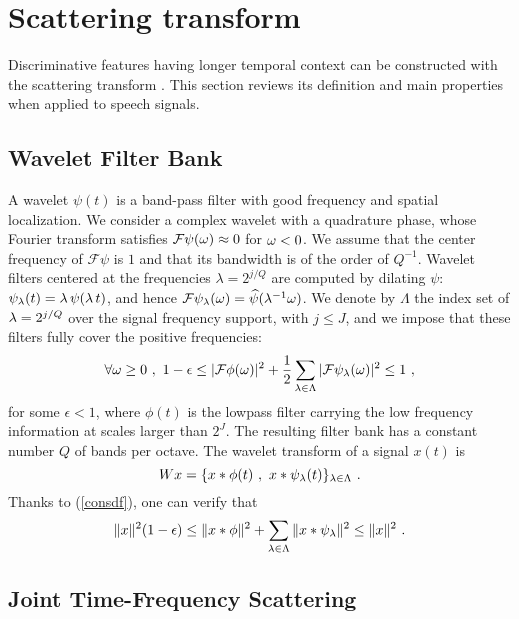 \section{Scattering transform}
\label{scattsec}

Discriminative features having longer temporal context can be constructed with the 
scattering transform \cite{pami, deepscatt}. 
This section reviews its definition and main properties when applied to speech signals.

\subsection{Wavelet Filter Bank}

A wavelet $\psi (t)$ is a band-pass filter with good frequency and spatial localization.
 We consider a complex wavelet with a quadrature phase, 
whose Fourier transform satisfies
$\mathcal{F} \psi({\omega}) \approx 0$ for ${\omega} < 0$.
We assume that the center frequency of $\mathcal{F} \psi$ is $1$ and 
that its bandwidth is of the order of $Q^{-1}$. 
Wavelet filters centered
at the frequencies $\lambda = 2^{j/Q}$ are computed by dilating $\psi$:
$\psi_{\lambda} (t) = {\lambda}\, \psi({\lambda}\, t)$, and hence $\mathcal{F} \psi_{\lambda} ({\omega}) = \widehat \psi({\lambda}^{-1} \omega)$.
We denote by $\Lambda$ the index set of ${\lambda} = 2^{j/Q}$ over
the signal frequency support, with $j \leq J$, 
and we impose that these filters fully cover the positive frequencies:
\begin{equation}
\label{consdf}
\forall {\omega} \geq 0~,~ 1- \epsilon 
\leq |\mathcal{F}{\phi}(\omega)|^2 + \frac 1 2 \sum_{{\lambda} \in \Lambda} |\mathcal{F}{\psi}_{\lambda}(\omega)|^2 \leq 1~,
\end{equation}
for some $\epsilon <1$, where $\phi(t)$ is the lowpass filter carrying the 
low frequency information at scales larger than $2^J$.
The resulting filter bank has a constant number $Q$ of bands per 
octave. The wavelet transform of a signal $x(t)$ is
\[
W x = \{x \ast \phi(t)~,~x \ast \psi_{\lambda}(t)  \}_{{\lambda} \in \Lambda}~.
\]
Thanks to (\ref{consdf}), one can verify that 
\begin{equation}
\label{lp_basic}
\| x \|^2 (1- \epsilon) \leq \| x \ast \phi \|^2 + \sum_{{\lambda} \in \Lambda} \| x \ast \psi_{\lambda} \|^2  \leq \| x \|^2~.
\end{equation}

\subsection{Joint Time-Frequency Scattering}

